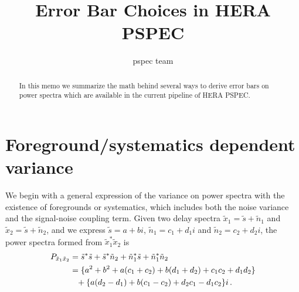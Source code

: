 \documentclass[12pt,a4paper]{article}
\title{Error Bar Choices in HERA PSPEC}
\author{pspec team}
\begin{document}
\maketitle{}
\begin{abstract}
    In this memo we summarize the math behind several ways to derive error bars on power spectra which are available in the current pipeline of HERA PSPEC.  
\end{abstract}

\section{Foreground/systematics dependent variance}
\label{ap:fg_dependent_var}

We begin with a general expression of the variance on power spectra with the existence of foregrounds or systematics, which includes both the noise variance and the signal-noise coupling term. Given two delay spectra $\tilde{x}_1 = \tilde{s} + \tilde{n}_1$ and $\tilde{x}_2 = \tilde{s} + \tilde{n}_2$, and we express $\tilde{s} = a + b i$, $\tilde{n}_1 = c_1 + d_1 i$ and $\tilde{n}_2 = c_2 + d_2 i$, the power spectra formed from $\tilde{x}_1^* \tilde{x}_2$ is 
\begin{align*}
P_{\tilde{x}_1\tilde{x}_2} & = \tilde{s}^*\tilde{s} + \tilde{s}^*\tilde{n}_2 + \tilde{n}_1^*\tilde{s} + 
\tilde{n}_1^*\tilde{n}_2 \notag \\
& = \{a^2+b^2 + a(c_1+c_2) + b(d_1+d_2) + c_1c_2 + d_1d_2\} \notag \\
& \phantom{=} + \{a(d_2-d_1)+b(c_1-c_2)+d_2 c_1-d_1 c_2\}i \,.
\end{align*}
\end{document}
